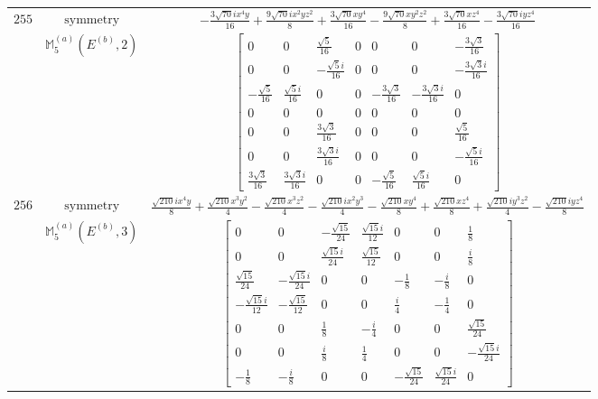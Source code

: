 \documentclass[fleqn,8pt,landscape]{jsarticle}
\begin{document}
\begin{longtable}{ccc}
$ 255 $ & $ \text{symmetry} $ & $ - \frac{3 \sqrt{70} i x^{4} y}{16} + \frac{9 \sqrt{70} i x^{2} y z^{2}}{8} + \frac{3 \sqrt{70} x y^{4}}{16} - \frac{9 \sqrt{70} x y^{2} z^{2}}{8} + \frac{3 \sqrt{70} x z^{4}}{16} - \frac{3 \sqrt{70} i y z^{4}}{16} $ \\
$  $ & $ \mathbb{M}_{5}^{(a)}(E^{(b)},2) $ & $ \begin{bmatrix} 0 & 0 & \frac{\sqrt{5}}{16} & 0 & 0 & 0 & - \frac{3 \sqrt{3}}{16} \\ 0 & 0 & - \frac{\sqrt{5} i}{16} & 0 & 0 & 0 & - \frac{3 \sqrt{3} i}{16} \\ - \frac{\sqrt{5}}{16} & \frac{\sqrt{5} i}{16} & 0 & 0 & - \frac{3 \sqrt{3}}{16} & - \frac{3 \sqrt{3} i}{16} & 0 \\ 0 & 0 & 0 & 0 & 0 & 0 & 0 \\ 0 & 0 & \frac{3 \sqrt{3}}{16} & 0 & 0 & 0 & \frac{\sqrt{5}}{16} \\ 0 & 0 & \frac{3 \sqrt{3} i}{16} & 0 & 0 & 0 & - \frac{\sqrt{5} i}{16} \\ \frac{3 \sqrt{3}}{16} & \frac{3 \sqrt{3} i}{16} & 0 & 0 & - \frac{\sqrt{5}}{16} & \frac{\sqrt{5} i}{16} & 0 \end{bmatrix} $ \\ \hline
$ 256 $ & $ \text{symmetry} $ & $ \frac{\sqrt{210} i x^{4} y}{8} + \frac{\sqrt{210} x^{3} y^{2}}{4} - \frac{\sqrt{210} x^{3} z^{2}}{4} - \frac{\sqrt{210} i x^{2} y^{3}}{4} - \frac{\sqrt{210} x y^{4}}{8} + \frac{\sqrt{210} x z^{4}}{8} + \frac{\sqrt{210} i y^{3} z^{2}}{4} - \frac{\sqrt{210} i y z^{4}}{8} $ \\
$  $ & $ \mathbb{M}_{5}^{(a)}(E^{(b)},3) $ & $ \begin{bmatrix} 0 & 0 & - \frac{\sqrt{15}}{24} & \frac{\sqrt{15} i}{12} & 0 & 0 & \frac{1}{8} \\ 0 & 0 & \frac{\sqrt{15} i}{24} & \frac{\sqrt{15}}{12} & 0 & 0 & \frac{i}{8} \\ \frac{\sqrt{15}}{24} & - \frac{\sqrt{15} i}{24} & 0 & 0 & - \frac{1}{8} & - \frac{i}{8} & 0 \\ - \frac{\sqrt{15} i}{12} & - \frac{\sqrt{15}}{12} & 0 & 0 & \frac{i}{4} & - \frac{1}{4} & 0 \\ 0 & 0 & \frac{1}{8} & - \frac{i}{4} & 0 & 0 & \frac{\sqrt{15}}{24} \\ 0 & 0 & \frac{i}{8} & \frac{1}{4} & 0 & 0 & - \frac{\sqrt{15} i}{24} \\ - \frac{1}{8} & - \frac{i}{8} & 0 & 0 & - \frac{\sqrt{15}}{24} & \frac{\sqrt{15} i}{24} & 0 \end{bmatrix} $ \\ \hline
\end{longtable}
\end{document}
